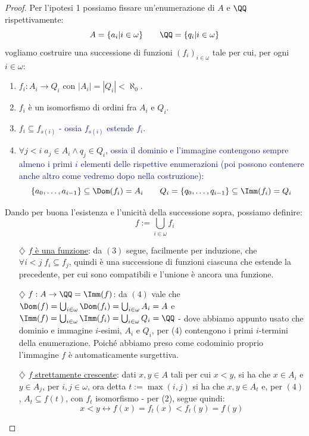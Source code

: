 \begin{proof}
	Per l'ipotesi 1 possiamo fissare un'enumerazione di $A$ e $\QQ$ rispettivamente:
	\[ A = \{a_i | i \in \omega\} \qquad \QQ = \{q_i | i \in \omega\}
		\]
	vogliamo costruire una successione di funzioni $(f_i)_{i \in \omega}$ tale per cui, per ogni $i \in \omega$:
	\begin{enumerate}[(1)]
		\item $f_i : A_i \rightarrow Q_i$ con $|A_i| = |Q_i| < \aleph_0$.
		\item $f_i$ è un isomorfismo di ordini fra $A_i$ e $Q_i$.
		\item $f_{i} \subseteq f_{s(i)}$ \textcolor{MidnightBlue}{- ossia $f_{s(i)}$ estende $f_i$}.
		\item $\forall j < i \; a_j \in A_i \land q_j \in Q_i$, \textcolor{MidnightBlue}{ossia il dominio e l'immagine contengono sempre almeno i primi $i$ elementi delle rispettive enumerazioni (poi possono contenere anche altro come vedremo dopo nella costruzione):
		\[ 	\{a_0,\ldots,a_{i-1}\} \subseteq \Dom(f_i) = A_i \qquad Q_i = \{q_0,\ldots,q_{i-1}\} \subseteq \Imm(f_i) = Q_i
			\]}
	\end{enumerate}
	Dando per buona l'esistenza e l'unicità della successione sopra, possiamo definire:
	\[ f := \bigcup_{i \in \omega} f_i
		\]
	\begin{itemize}
		\item[$\diamondsuit$] \underline{$f$ è una funzione}: da $(3)$ segue, facilmente per induzione, che $\forall i < j \; f_i \subseteq f_j$, quindi è una successione di funzioni ciascuna che estende la precedente, per cui sono compatibili e l'unione è ancora una funzione.
		\item[$\diamondsuit$] \underline{$f : A \to \QQ = \Imm(f)$}: da $(4)$ vale che $\Dom(f) = \bigcup_{i \in \omega}\Dom(f_i) = \bigcup_{i \in \omega} A_i = A$ e $\Imm(f) = \bigcup_{i \in \omega}\Imm(f_i) = \bigcup_{i \in \omega} Q_i = \QQ$ - dove abbiamo appunto usato
		che dominio e immagine $i$-esimi, $A_i$ e $Q_i$, per (4) contengono i primi $i$-termini della enumerazione. Poiché abbiamo preso come codominio proprio l'immagine $f$ è automaticamente surgettiva. 
		\item[$\diamondsuit$] \underline{$f$ strettamente crescente}: dati $x, y \in A$ tali per cui $x < y$, si ha che $x \in A_i$ e $y \in A_j$, per $i,j \in \omega$, ora detta $t:= \max(i,j)$ si ha che $x,y \in A_t$ e, per $(4)$, $A_t \subseteq f(t)$, con $f_t$ isomorfismo - per (2), segue quindi:
		\[ x < y \leftrightarrow f(x) = f_t(x) < f_t(y) = f(y)
\]
\end{itemize}
\end{proof}
